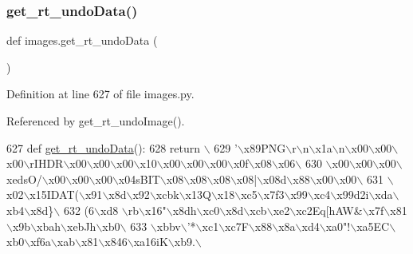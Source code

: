 \subsubsection{\texorpdfstring{get\+\_\+rt\+\_\+undo\+Data()}{get\_rt\_undoData()}}
{\footnotesize\ttfamily def images.\+get\+\_\+rt\+\_\+undo\+Data (\begin{DoxyParamCaption}{ }\end{DoxyParamCaption})}



Definition at line 627 of file images.\+py.



Referenced by get\+\_\+rt\+\_\+undo\+Image().


\begin{DoxyCode}
627 \textcolor{keyword}{def }\hyperlink{namespaceimages_a9c965a0dce12c259b4545a995e0c4b73}{get\_rt\_undoData}():
628     \textcolor{keywordflow}{return} \(\backslash\)
629 \textcolor{stringliteral}{'\(\backslash\)x89PNG\(\backslash\)r\(\backslash\)n\(\backslash\)x1a\(\backslash\)n\(\backslash\)x00\(\backslash\)x00\(\backslash\)x00\(\backslash\)rIHDR\(\backslash\)x00\(\backslash\)x00\(\backslash\)x00\(\backslash\)x10\(\backslash\)x00\(\backslash\)x00\(\backslash\)x00\(\backslash\)x0f\(\backslash\)x08\(\backslash\)x06\(\backslash\)}
630 \textcolor{stringliteral}{\(\backslash\)x00\(\backslash\)x00\(\backslash\)x00\(\backslash\)xedsO/\(\backslash\)x00\(\backslash\)x00\(\backslash\)x00\(\backslash\)x04sBIT\(\backslash\)x08\(\backslash\)x08\(\backslash\)x08\(\backslash\)x08|\(\backslash\)x08d\(\backslash\)x88\(\backslash\)x00\(\backslash\)x00\(\backslash\)}
631 \textcolor{stringliteral}{\(\backslash\)x02\(\backslash\)x15IDAT(\(\backslash\)x91\(\backslash\)x8d\(\backslash\)x92\(\backslash\)xcbk\(\backslash\)x13Q\(\backslash\)x18\(\backslash\)xc5\(\backslash\)x7f3\(\backslash\)x99\(\backslash\)xc4\(\backslash\)x99d2i\(\backslash\)xda\(\backslash\)xb4\(\backslash\)x8d\}\(\backslash\)}
632 \textcolor{stringliteral}{(6\(\backslash\)xd8 \(\backslash\)rb\(\backslash\)x16"\(\backslash\)x8dh\(\backslash\)xc0\(\backslash\)x8d\(\backslash\)xcb\(\backslash\)xe2\(\backslash\)xc2Eq[hAW&\(\backslash\)x7f\(\backslash\)x81\(\backslash\)x9b\(\backslash\)xbah\(\backslash\)xebJh\(\backslash\)xb0\(\backslash\)}
633 \textcolor{stringliteral}{\(\backslash\)xbbv\(\backslash\)'*\(\backslash\)xc1\(\backslash\)xc7F\(\backslash\)x88\(\backslash\)x8a\(\backslash\)xd4\(\backslash\)xa0"!\(\backslash\)xa5EC\(\backslash\)xb0\(\backslash\)xf6a\(\backslash\)xab\(\backslash\)x81\(\backslash\)x846\(\backslash\)xa16iK\(\backslash\)xb9.\(\backslash\)}

\end{DoxyCode}
